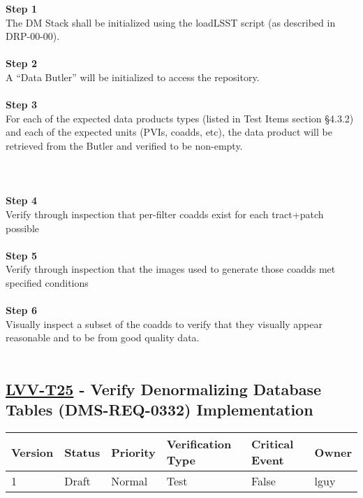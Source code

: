 \textbf{Step 1}\\
The DM Stack shall be initialized using the loadLSST script (as
described in DRP-00-00).\\
~\\
\textbf{Step 2}\\
A ``Data Butler'' will be initialized to access the repository.\\
~\\
\textbf{Step 3}\\
For each of the expected data products types (listed in Test Items
section §4.3.2) and each of the expected units (PVIs, coadds, etc), the
data product will be retrieved from the Butler and verified to be
non-empty.\\
~\\
~\\
~\\
\textbf{Step 4}\\
Verify through inspection that per-filter coadds exist for each
tract+patch possible\\
~\\
\textbf{Step 5}\\
Verify through inspection that the images used to generate those coadds
met specified conditions\\
~\\
\textbf{Step 6}\\
Visually inspect a subset of the coadds to verify that they visually
appear reasonable and to be from good quality data.\\
~\\

\hypertarget{lvv-t25---verify-denormalizing-database-tables-dms-req-0332-implementation}{%
\subsection{\texorpdfstring{\href{https://jira.lsstcorp.org/secure/Tests.jspa\#/testCase/LVV-T25}{LVV-T25}
- Verify Denormalizing Database Tables (DMS-REQ-0332)
Implementation}{LVV-T25 - Verify Denormalizing Database Tables (DMS-REQ-0332) Implementation}}\label{lvv-t25---verify-denormalizing-database-tables-dms-req-0332-implementation}}

\begin{longtable}[]{@{}llllll@{}}
\toprule
Version & Status & Priority & Verification Type & Critical Event &
Owner\tabularnewline
\midrule
\endhead
1 & Draft & Normal & Test & False & lguy\tabularnewline
\bottomrule
\end{longtable}

